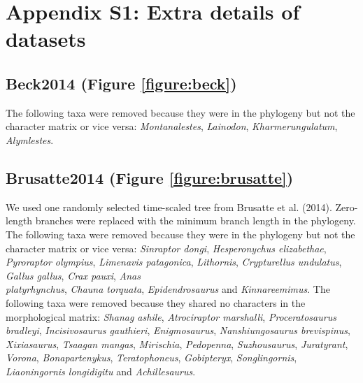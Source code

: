 \documentclass[12pt,a4paper]{article}
\begin{document}
\par{}

\setlength{\parindent}{1cm}

\section{Appendix S1: Extra details of datasets}

\subsection{Beck2014 (Figure \ref{figure:beck})}
The following taxa were removed because they were in the phylogeny but not the character matrix or vice versa: \textit{Montanalestes}, \textit{Lainodon}, \textit{Kharmerungulatum}, \textit{Alymlestes}. 

\subsection{Brusatte2014 (Figure \ref{figure:brusatte})} 
We used one randomly selected time-scaled tree from Brusatte et al. (2014).
Zero-length branches were replaced with the minimum branch length in the phylogeny.
The following taxa were removed because they were in the phylogeny but not the character matrix or vice versa: \textit{Sinraptor dongi}, \textit{Hesperonychus elizabethae}, \textit{Pyroraptor olympius}, \textit{Limenavis patagonica}, \textit{Lithornis}, \textit{Crypturellus undulatus}, \textit{Gallus gallus}, \textit{Crax pauxi}, \textit{Anas}\\ \textit{platyrhynchus}, \textit{Chauna torquata}, \textit{Epidendrosaurus} and \textit{Kinnareemimus}. 
The following taxa were removed because they shared no characters in the morphological matrix: \textit{Shanag ashile}, \textit{Atrociraptor marshalli}, \textit{Proceratosaurus bradleyi}, \textit{Incisivosaurus gauthieri}, \textit{Enigmosaurus}, \textit{Nanshiungosaurus brevispinus}, \textit{Xixiasaurus}, \textit{Tsaagan mangas}, \textit{Mirischia}, \textit{Pedopenna}, \textit{Suzhousaurus}, \textit{Juratyrant}, \textit{Vorona}, \textit{Bonapartenykus}, \textit{Teratophoneus}, \textit{Gobipteryx}, \textit{Songlingornis}, \textit{Liaoningornis longidigitu} and \textit{Achillesaurus}.   
\end{document}
